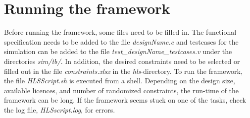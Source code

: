 \section{\label{sec:runframework}Running the framework}
Before running the framework, some files need to be filled in. The functional specification needs to be added to the file \textit{designName.c} and testcases for the simulation can be added to the file \textit{test\_designName\_testcases.v} under the directories \textit{sim/tb/}. In addition, the desired constraints need to be selected or filled out in the file \textit{constraints.xlsx} in the \textit{hls}-directory. To run the framework, the file \textit{HLSScript.sh} is executed from a shell. Depending on the design size, available licences, and number of randomized constraints, the run-time of the framework can be long. If the framework seems stuck on one of the tasks, check the log file, \textit{HLSscript.log}, for errors.

